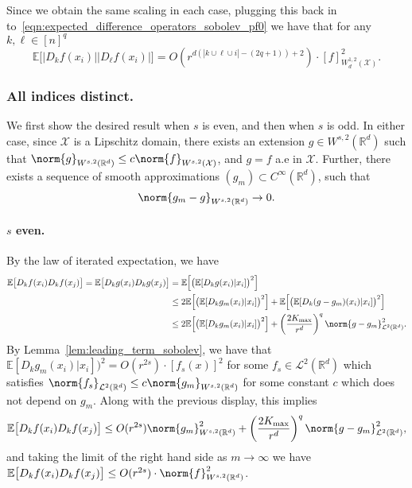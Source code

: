 \documentclass{article}
\newcommand{\Reals}{\mathbb{R}}
\newcommand{\abs}[1]{\left \lvert #1 \right \rvert}
\newcommand{\1}{\mathbf{1}}
\newcommand{\Rd}{\Reals^d}
\newcommand{\Xset}{\mathcal{X}}
\newcommand{\Leb}{\mathcal{L}}
\newcommand{\Ebb}{\mathbb{E}}
\theoremstyle{alden}
\theoremstyle{aldenthm}
\theoremstyle{definition}
\theoremstyle{remark}
\begin{document}
Since we obtain the same scaling in each case, plugging this back in to~\eqref{eqn:expected_difference_operators_sobolev_pf0} we have that for any $k, \ell \in [n]^q$
\begin{equation*}
\Ebb\bigl[\abs{D_kf(x_i)} \abs{D_\ell f(x_i)}\bigr] = O(r^{d(\abs{k \cup \ell \cup i} - (2q + 1)) + 2}) \cdot [f]_{W_d^{1,2}(\Xset)}^2.
\end{equation*}

\subsubsection{All indices distinct.}

We first show the desired result when $s$ is even, and then when $s$ is odd. In either case, since $\Xset$ is a Lipschitz domain, there exists an extension $g \in W^{s,2}(\Rd)$ such that $\norm{g}_{W^{s,2}(\Rd)} \leq c \norm{f}_{W^{s,2}(\Xset)}$, and $g = f$ a.e in $\Xset$. Further, there exists a sequence of smooth approximations $(g_m) \subset C^{\infty}(\Rd)$, such that
\begin{equation*}
\norm{g_m - g}_{W^{s,2}(\Rd)} \to 0.
\end{equation*}

\paragraph{$s$ even.}

By the law of iterated expectation, we have
\begin{align*}
\Ebb\bigl[D_kf(x_i)D_kf(x_j)\bigr] = \Ebb\bigl[D_kg(x_i)D_kg(x_j)\bigr] & = \Ebb\Bigl[\bigl(\Ebb[D_kg(x_i)|x_i]\bigr)^2\Bigr] \\
& \leq 2\Ebb\Bigl[\bigl(\Ebb[D_kg_m(x_i)|x_i]\bigr)^2\Bigr] + \Ebb\Bigl[\bigl(\Ebb[D_k(g - g_m)(x_i)|x_i]\bigr)^2\Bigr] \\
& \leq 2\Ebb\Bigl[\bigl(\Ebb[D_kg_m(x_i)|x_i]\bigr)^2\Bigr] + \left(\frac{2K_{\max}}{r^d}\right)^q \norm{g - g_m}_{\Leb^2(\Rd)}^2.
\end{align*}
By Lemma~\ref{lem:leading_term_sobolev}, we have that $\Ebb[D_kg_m(x_i)|x_i]\bigr)^2 = O(r^{2s})\cdot [f_s(x)]^2$ for some $f_s \in \Leb^2(\Rd)$ which satisfies $\norm{f_s}_{\Leb^2(\Rd)} \leq c \norm{g_m}_{W^{s,2}(\Rd)}$ for some constant $c$ which does not depend on $g_m$. Along with the previous display, this implies
\begin{equation*}
\Ebb\bigl[D_kf(x_i)D_kf(x_j)\bigr] \leq O(r^{2s}) \norm{g_m}_{W^{s,2}(\Rd)}^2 + \left(\frac{2K_{\max}}{r^d}\right)^q \norm{g - g_m}_{\Leb^2(\Rd)}^2,
\end{equation*}
and taking the limit of the right hand side as $m \to \infty$ we have $\Ebb\bigl[D_kf(x_i)D_kf(x_j)\bigr] \leq O(r^{2s})\cdot\norm{f}_{W^{s,2}(\Rd)}^2$.
\end{document}
